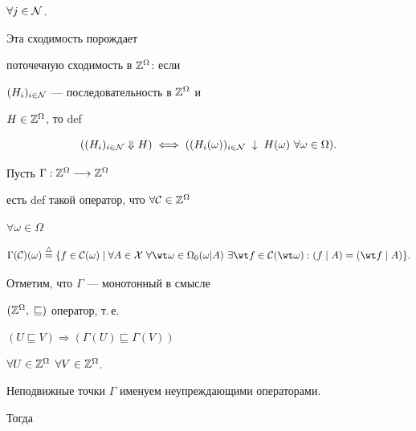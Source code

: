 $\forall{j} \in {\cal N}$.


Эта сходимость порождает


поточечную сходимость в ${\Bbb Z}^{\Omega}$: если


$(H_i)_{i \in {\cal N}}$ --- последовательность в ${\Bbb Z}^{\Omega}$ и


$H \in {{\Bbb Z}^{\Omega}}$, то def


\begin{equation}


((H_i)_{i \in {\cal N}} \Downarrow H)\;\Longleftrightarrow\;


(({H_i}(\omega))_{i \in {\cal N}}\;\downarrow\;{H(\omega)}


\ \forall{\omega} \in \Omega).


\end{equation}


Пусть $\Gamma:{{\Bbb Z}^{\Omega}} \longrightarrow {{\Bbb Z}^{\Omega}}$


есть def такой оператор, что $\forall{\cal C} \in {{\Bbb Z}^{\Omega}}$


$\forall{\omega} \in \Omega$


\begin{equation}


{\Gamma}({\cal C})(\omega)\stac \{f \in


{\cal C}(\omega) \mid \forall{A} \in {\cal X}\ \forall{\wt \omega} \in


{{\Omega}_0}(\omega | A)\ \exists{\wt f} \in {\cal C}({\wt


\omega}):


(f \mid A) = ({\wt f} \mid A)\}.


\end{equation}


Отметим, что $\Gamma$ --- монотонный в смысле


$({{\Bbb Z}^{\Omega}},\;\sqsubseteq)$ оператор, т.\,е.


$(U \sqsubseteq V) \Longrightarrow ({\Gamma}(U) \sqsubseteq {\Gamma}(V))$


$\forall{U} \in {{\Bbb Z}^{\Omega}}$ $\forall{V} \in{{\Bbb Z}^{\Omega}}$.


Неподвижные точки $\Gamma$ именуем неупреждающими операторами.


Тогда


